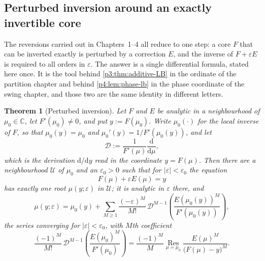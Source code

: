 \documentclass[11pt,a4paper,oneside]{book}
\theoremstyle{plain}
\newtheorem{theorem}{Theorem}[chapter]
\theoremstyle{definition}
\theoremstyle{remark}
\newcommand{\Cplx}{\mathbb{C}}
\newcommand{\dd}{\mathrm{d}}
\begin{document}
\subsection{Perturbed inversion around an exactly invertible core}
\label{p0:sec:perturbed}

The reversions carried out in Chapters~1--4 all reduce to one step: a core
$F$ that can be inverted exactly is perturbed by a correction $E$, and the
inverse of $F+\varepsilon E$ is required to all orders in $\varepsilon$.  The
answer is a single differential formula, stated here once.  It is the tool
behind \cref{p3:thm:additive-LB} in the ordinate of the partition chapter and
behind \cref{p4:lem:phase-lb} in the phase coordinate of the swing chapter,
and those two are the same identity in different letters.

\begin{theorem}[Perturbed inversion]\label{p0:thm:perturbed-inversion}
Let $F$ and $E$ be analytic in a neighbourhood of $\mu_{0}\in\Cplx$, let
$F'(\mu_{0})\ne0$, and put $y:=F(\mu_{0})$.  Write $\mu_{0}(\cdot)$ for the
local inverse of $F$, so that $\mu_{0}(y)=\mu_{0}$ and
$\mu_{0}'(y)=1/F'(\mu_{0}(y))$, and let
\begin{equation}\label{p0:eq:reversion-operator}
 \mathcal{D}:=\frac1{F'(\mu)}\frac{\dd}{\dd\mu},
\end{equation}
which is the derivation $\dd/\dd y$ read in the coordinate $y=F(\mu)$.  Then
there are a neighbourhood $\mathcal{U}$ of $\mu_{0}$ and an
$\varepsilon_{0}>0$ such that for $|\varepsilon|<\varepsilon_{0}$ the equation
\begin{equation}\label{p0:eq:perturbed-equation}
 F(\mu)+\varepsilon E(\mu)=y
\end{equation}
has exactly one root $\mu(y;\varepsilon)$ in $\mathcal{U}$; it is analytic in
$\varepsilon$ there, and
\begin{equation}\label{p0:eq:perturbed-inversion}
 \mu(y;\varepsilon)=\mu_{0}(y)
 +\sum_{M\ge1}\frac{(-\varepsilon)^{M}}{M!}\,
 \mathcal{D}^{M-1}\!\left(\frac{E(\mu_{0}(y))^{M}}{F'(\mu_{0}(y))}\right),
\end{equation}
the series converging for $|\varepsilon|<\varepsilon_{0}$, with $M$th
coefficient
\begin{equation}\label{p0:eq:perturbed-residue}
 \frac{(-1)^{M}}{M!}\,\mathcal{D}^{M-1}\!
 \left(\frac{E(\mu_{0})^{M}}{F'(\mu_{0})}\right)
 =\frac{(-1)^{M}}{M}\operatorname*{Res}_{\mu=\mu_{0}}
 \frac{E(\mu)^{M}}{\bigl(F(\mu)-y\bigr)^{M}} .
\end{equation}

\end{theorem}
\end{document}
